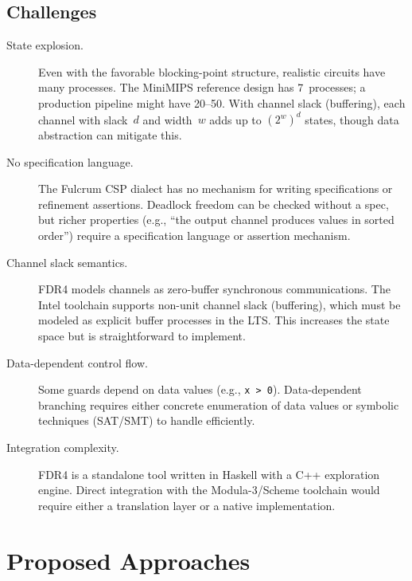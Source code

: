 \documentclass[11pt]{article}
\begin{document}
\subsection{Challenges}

\begin{description}
\item[State explosion.]
  Even with the favorable blocking-point structure, realistic circuits
  have many processes.  The MiniMIPS reference design has 7~processes;
  a production pipeline might have 20--50.  With channel slack
  (buffering), each channel with slack~$d$ and width~$w$ adds up to
  $(2^w)^d$ states, though data abstraction can mitigate this.

\item[No specification language.]
  The Fulcrum CSP dialect has no mechanism for writing specifications or
  refinement assertions.  Deadlock freedom can be checked without a
  spec, but richer properties (e.g., ``the output channel produces
  values in sorted order'') require a specification language or
  assertion mechanism.

\item[Channel slack semantics.]
  FDR4 models channels as zero-buffer synchronous communications.
  The Intel toolchain supports non-unit channel slack (buffering),
  which must be modeled as explicit buffer processes in the LTS.
  This increases the state space but is straightforward to implement.

\item[Data-dependent control flow.]
  Some guards depend on data values (e.g., \texttt{x > 0}).
  Data-dependent branching requires either concrete enumeration of
  data values or symbolic techniques (SAT/SMT) to handle efficiently.

\item[Integration complexity.]
  FDR4 is a standalone tool written in Haskell with a C++ exploration
  engine.  Direct integration with the Modula-3/Scheme toolchain
  would require either a translation layer or a native implementation.
\end{description}

\section{Proposed Approaches}
\end{document}
